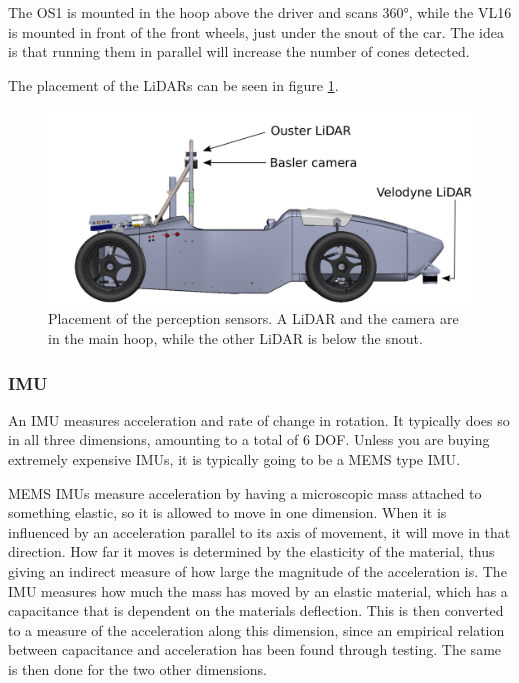 The OS1 is mounted in the hoop above the driver and scans $360$\si{\degree}, while the VL16 is mounted in front of the front wheels, just under the snout of the car. The idea is that running them in parallel will increase the number of cones detected. 

The placement of the \glspl{LiDAR} can be seen in figure \ref{Fig:SensorPlacementsV2}.


\begin{figure}
    \centering
    \includegraphics[width=0.8\linewidth]{0_Images/3_Background/SensorPlacements.pdf}
    \caption[Placement of the perception sensors.]{Placement of the perception sensors. A LiDAR and the camera are in the main hoop, while the other LiDAR is below the snout.}
    \label{Fig:SensorPlacementsV2}
\end{figure}

\subsubsection{IMU}
An \gls{IMU} measures acceleration and rate of change in rotation. It typically does so in all three dimensions, amounting to a total of 6 \gls{DOF}. Unless you are buying extremely expensive \glspl{IMU}, it is typically going to be a \gls{MEMS} type \gls{IMU}. 

\gls{MEMS} \glspl{IMU} measure acceleration by having a microscopic mass attached to something elastic, so it is allowed to move in one dimension. When it is influenced by an acceleration parallel to its axis of movement, it will move in that direction. How far it moves is determined by the elasticity of the material, thus giving an indirect measure of how large the magnitude of the acceleration is. The \gls{IMU} measures how much the mass has moved by an elastic material, which has a capacitance that is dependent on the materials deflection. This is then converted to a measure of the acceleration along this dimension, since an empirical relation between capacitance and acceleration has been found through testing. The same is then done for the two other dimensions. 

